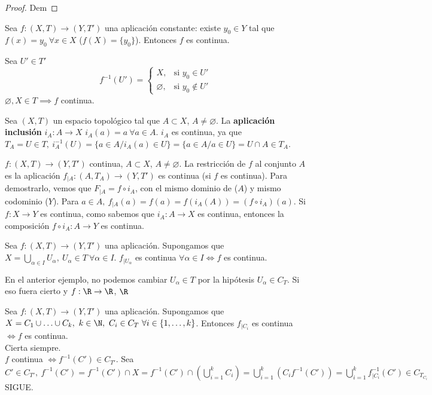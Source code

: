 \begin{proof}
    Dem
\end{proof}
\begin{exmp}
  Sea $f:(X,T) \to (Y,T')$ una aplicación constante: existe $y_0 \in Y$ tal que $f(x)=y_0\ \forall x \in X$ ($f(X)=\{y_0\}$). Entonces $f$ es continua. 
\end{exmp}
\begin{exmp}
  Sea $U' \in T'$
  \[ f^{-1}(U')=
    \begin{cases}
      X, & \text{si } y_0 \in U' \\ \varnothing,& \text{si } y_0 \not\in U'
    \end{cases}\]
    $\varnothing,X \in T \implies f$ continua.
\end{exmp}
\begin{exmp}
  Sea $(X,T)$ un espacio topológico tal que $A \subset X$, $A \neq \varnothing$. La \textbf{aplicación inclusión} $i_A: A \to X$ $i_A(a)=a \ \forall a \in A$. $i_A$ es continua, ya que $T_A=U \in T,\ i^{-1}_A(U)=\{a \in A / i_A(a) \in U\}=\{a \in A / a \in U\}=U \cap A \in T_A$.
\end{exmp}
\begin{exmp}
  $f:(X,T) \to (Y,T')$ continua, $A \subset X$, $A \neq \varnothing$. La restricción de $f$ al conjunto $A$ es la aplicación $f_{|A}: (A,T_A) \to(Y,T')$ es continua (si $f$ es continua). Para demostrarlo, vemos que $F_{|A} = f \circ i_A$, con el mismo dominio de ($A$) y mismo codominio ($Y$). Para $a \in A, \ f_{|A}(a)=f(a)=f(i_A(A))=(f \circ i_A)(a)$. Si $f:X \to Y$ es continua, como sabemos que $i_A:A \to X$ es continua, entonces la composición $f \circ i_A:A \to Y$ es continua.
\end{exmp}
\begin{exmp}
  Sea $f: (X,T) \to (Y,T')$ una aplicación. Supongamos que $X = \bigcup_{\alpha \in I}U_{\alpha},\ U_{\alpha} \in T \ \forall \alpha \in I$. $f_{|U_{\alpha}}$ es continua $\forall \alpha \in I \Leftrightarrow f$ es continua.
\end{exmp}
En el anterior ejemplo, no podemos cambiar $U_{\alpha} \in T$ por la hipótesis $U_{\alpha} \in C_T$. Si eso fuera cierto y $f: \R \to \R$, $\R$

\begin{exmp}
  Sea $f:(X,T) \to (Y,T')$ una aplicación. Supongamos que $X=C_1 \cup \ldots \cup C_k,\ k \in \N,\ C_i \in C_T \ \forall i \in \{1,\ldots,k\}$. Entonces $f_{|C_i}$ es continua $\Leftrightarrow f$ es continua. \\
  \fbox{$\Leftarrow$} Cierta siempre. \\
  \fbox{$\Rightarrow$} $f$ continua $\Leftrightarrow f^{-1}(C') \in C_{T'}$. Sea $C' \in C_{T'},\ f^{-1}(C')=f^{-1}(C') \cap X = f^{-1}(C') \cap (\bigcup^k_{i=1}C_i)=\bigcup^k_{i=1} (C_if^{-1}(C')) = \bigcup_{i=1}^kf^{-1}_{|C_i}(C') \in C_{T_{C_i}}$ SIGUE.
\end{exmp}


